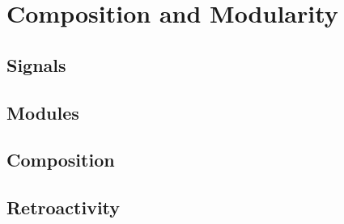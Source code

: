 \chapter{Composition and Modularity}

\section{Signals}

\section{Modules}


\section{Composition}

\section{Retroactivity}